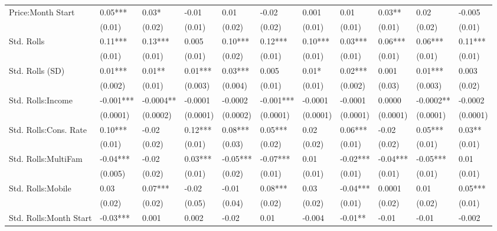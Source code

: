 \begin{table}[]
{\begin{tabular}{lllllllllll}
Price:Month Start      & 0.05***  & 0.03*     & -0.01    & 0.01     & -0.02    & 0.001    & 0.01      & 0.03**      & 0.02     & -0.005    \\
                       & (0.01)   & (0.02)    & (0.01)   & (0.02)   & (0.02)   & (0.01)   & (0.01)    & (0.01)      & (0.02)   & (0.01)   \\
Std. Rolls             & 0.11***  & 0.13***   & 0.005    & 0.10***  & 0.12***  & 0.10***  & 0.03***   & 0.06***     & 0.06***  & 0.11***  \\
                       & (0.01)   & (0.01)    & (0.01)   & (0.02)   & (0.01)   & (0.01)   & (0.01)    & (0.01)      & (0.01)   & (0.01)   \\
Std. Rolls (SD)        & 0.01***  & 0.01**    & 0.01***  & 0.03***  & 0.005    & 0.01*    & 0.02***   & 0.001       & 0.01***  & 0.003  \\
                       & (0.002)  & (0.01)    & (0.003)  & (0.004)  & (0.01)   & (0.01)   & (0.002)   & (0.03)      & (0.003)  & (0.02)   \\
Std. Rolls:Income      & -0.001***& -0.0004** & -0.0001  & -0.0002  & -0.001***& -0.0001  & -0.0001   & 0.0000      & -0.0002**& -0.0002  \\
                       & (0.0001) & (0.0002)  & (0.0001) & (0.0002) & (0.0001) & (0.0001) & (0.0001)  & (0.0001)    & (0.0001) & (0.0001) \\
Std. Rolls:Cons. Rate  & 0.10***  & -0.02     & 0.12***  & 0.08***  & 0.05***  & 0.02     & 0.06***   & -0.02       & 0.05***  & 0.03**   \\
                       & (0.01)   & (0.02)    & (0.01)   & (0.03)   & (0.02)   & (0.02)   & (0.01)    & (0.02)      & (0.01)   & (0.01)   \\
Std. Rolls:MultiFam    & -0.04*** & -0.02     & 0.03***  & -0.05*** & -0.07*** & 0.01     & -0.02***  & -0.04***    & -0.05*** & 0.01     \\
                       & (0.005)   & (0.02)   & (0.01)   & (0.02)   & (0.01)   & (0.01)   & (0.01)    & (0.01)      & (0.01)   & (0.01)   \\
Std. Rolls:Mobile      & 0.03     & 0.07***   & -0.02    & -0.01    & 0.08***  & 0.03     & -0.04***  & 0.0001      & 0.01     & 0.05***  \\
                       & (0.02)   & (0.02)    & (0.05)   & (0.04)   & (0.02)   & (0.02)   & (0.01)    & (0.02)      & (0.02)   & (0.01)   \\
Std. Rolls:Month Start & -0.03*** & 0.001     & 0.002    & -0.02    & 0.01     & -0.004   & -0.01**   & -0.01       & -0.01    & -0.002   \\

\end{tabular}}
\end{table}
